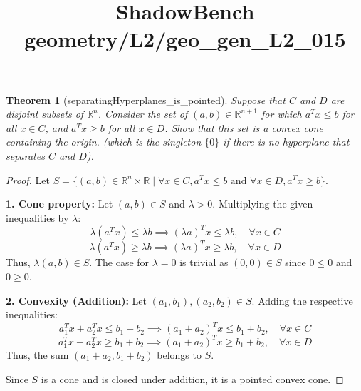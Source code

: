 \documentclass{article}
\title{ShadowBench geometry/L2/geo\_gen\_L2\_015}
\newtheorem{theorem}{Theorem}
\begin{document}
\maketitle

\begin{theorem}[separatingHyperplanes_is_pointed]
Suppose that $C$ and $D$ are disjoint subsets of $\mathbb{R}^n$. Consider the set of $(a, b) \in \mathbb{R}^{n+1}$ for which $a^T x \le b$ for all $x \in C$, and $a^T x \ge b$ for all $x \in D$. Show that this set is a convex cone containing the origin. (which is the singleton $\{0\}$ if there is no hyperplane that separates $C$ and $D$).
\end{theorem}

\begin{proof}
Let $S = \{ (a, b) \in \mathbb{R}^n \times \mathbb{R} \mid \forall x \in C, a^T x \le b \text{ and } \forall x \in D, a^T x \ge b \}$.

\textbf{1. Cone property:} 
Let $(a, b) \in S$ and $\lambda > 0$. Multiplying the given inequalities by $\lambda$:
\[ \lambda (a^T x) \le \lambda b \implies (\lambda a)^T x \le \lambda b, \quad \forall x \in C \]
\[ \lambda (a^T x) \ge \lambda b \implies (\lambda a)^T x \ge \lambda b, \quad \forall x \in D \]
Thus, $\lambda(a, b) \in S$. The case for $\lambda=0$ is trivial as $(0,0) \in S$ since $0 \le 0$ and $0 \ge 0$.

\textbf{2. Convexity (Addition):} 
Let $(a_1, b_1), (a_2, b_2) \in S$. Adding the respective inequalities:
\[ a_1^T x + a_2^T x \le b_1 + b_2 \implies (a_1 + a_2)^T x \le b_1 + b_2, \quad \forall x \in C \]
\[ a_1^T x + a_2^T x \ge b_1 + b_2 \implies (a_1 + a_2)^T x \ge b_1 + b_2, \quad \forall x \in D \]
Thus, the sum $(a_1 + a_2, b_1 + b_2)$ belongs to $S$. 

Since $S$ is a cone and is closed under addition, it is a pointed convex cone.
\end{proof}
\end{document}

